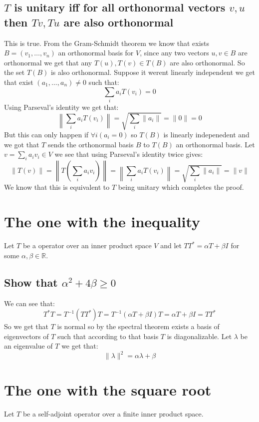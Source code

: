 \documentclass[11pt,a4paper]{article}
\theoremstyle{plain}
\newcommand{\R}{\mathbb{R}}
\begin{document}
	\newpage
	
	\subsection{$T$ is unitary iff for all orthonormal vectors $v,u$ then 
	$Tv,Tu$ are also orthonormal}
	This is true. From the Gram-Schmidt theorem we know that exists 
	$B=(v_1,\dots,v_n)$ an orthonormal basis for $V$, since any two vectors 
	$u,v\in B$ are orthonormal we get that any $T(u),T(v)\in T(B)$ are also 
	orthonormal. So the set $T(B)$ is also orthonormal. Suppose it werent 
	linearly independent we get that exist $(a_1,\dots,a_n)\neq 0$ such that:
	\[
		\sum_{i}{a_i T(v_i)} = 0
	\]
	Using Parseval's identity we get that:
	\[
		\left\|\sum_{i}{a_i T(v_i)}\right\| = 
		\sqrt{\sum_{i}{\|a_i\|}} = \|0\| = 0
	\]
	But this can only happen if $\forall i(a_i = 0)$ so $T(B)$ is linearly
	indepenedent and we got that $T$ sends the orthonormal basis $B$ to 
	$T(B)$ an orthonormal basis. Let $v=\sum_{i}{a_i v_i}\in V$ we see that 
	using Parseval's identity twice gives:
	\[
		\|T(v)\| = \left\|T\left(\sum_{i}{a_i v_i}\right)\right\| 
		= \left\|\sum_{i}{a_i T(v_i)}\right\| = 
		\sqrt{\sum_{i}{\|a_i\|}} = \|v\|
	\]
	We know that this is equivalent to $T$ being unitary which completes the
	proof.
	
	\newpage
	
	\section{The one with the inequality}
	Let $T$ be a operator over an inner product space $V$ and let 
	$TT^{*}=\alpha T + \beta I$ for some $\alpha,\beta\in\R$.
	\subsection{Show that $\alpha^2+4\beta \ge 0$}
	We can see that:
	\[
		T^*T = T^{-1}(TT^{*})T = T^{-1}(\alpha T + \beta I)T = \alpha T + \beta I = 
		TT^*
	\]
	So we get that $T$ is normal so by the spectral theorem exists a basis of
	eigenvectors of $T$ such that according to that basis $T$ is diagonalizable.
	Let $\lambda$ be an eigenvalue of $T$ we get that:
	\[
		\|\lambda\|^2 = \alpha \lambda + \beta
	\]
	
	
	\newpage
	
	\section{The one with the square root}
	Let $T$ be a self-adjoint operator over a finite inner product space.
\end{document}
